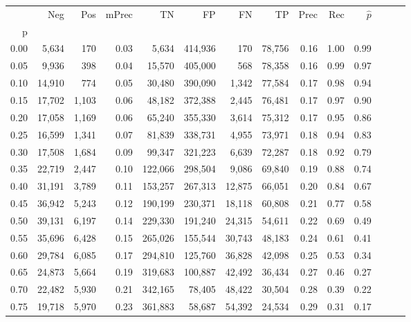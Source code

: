 \begin{tabular}{rrrrrrrrrrrrrr}
\toprule
{} &     Neg &    Pos & mPrec &       TN &       FP &      FN &      TP &  Prec &   Rec & $\hat{p}$ \\
p    &         &        &       &          &          &         &         &       &       &           \\
\midrule
0.00 &   5,634 &    170 &  0.03 &    5,634 &  414,936 &     170 &  78,756 &  0.16 &  1.00 &      0.99 \\
0.05 &   9,936 &    398 &  0.04 &   15,570 &  405,000 &     568 &  78,358 &  0.16 &  0.99 &      0.97 \\
0.10 &  14,910 &    774 &  0.05 &   30,480 &  390,090 &   1,342 &  77,584 &  0.17 &  0.98 &      0.94 \\
0.15 &  17,702 &  1,103 &  0.06 &   48,182 &  372,388 &   2,445 &  76,481 &  0.17 &  0.97 &      0.90 \\
0.20 &  17,058 &  1,169 &  0.06 &   65,240 &  355,330 &   3,614 &  75,312 &  0.17 &  0.95 &      0.86 \\
0.25 &  16,599 &  1,341 &  0.07 &   81,839 &  338,731 &   4,955 &  73,971 &  0.18 &  0.94 &      0.83 \\
0.30 &  17,508 &  1,684 &  0.09 &   99,347 &  321,223 &   6,639 &  72,287 &  0.18 &  0.92 &      0.79 \\
0.35 &  22,719 &  2,447 &  0.10 &  122,066 &  298,504 &   9,086 &  69,840 &  0.19 &  0.88 &      0.74 \\
0.40 &  31,191 &  3,789 &  0.11 &  153,257 &  267,313 &  12,875 &  66,051 &  0.20 &  0.84 &      0.67 \\
0.45 &  36,942 &  5,243 &  0.12 &  190,199 &  230,371 &  18,118 &  60,808 &  0.21 &  0.77 &      0.58 \\
0.50 &  39,131 &  6,197 &  0.14 &  229,330 &  191,240 &  24,315 &  54,611 &  0.22 &  0.69 &      0.49 \\
0.55 &  35,696 &  6,428 &  0.15 &  265,026 &  155,544 &  30,743 &  48,183 &  0.24 &  0.61 &      0.41 \\
0.60 &  29,784 &  6,085 &  0.17 &  294,810 &  125,760 &  36,828 &  42,098 &  0.25 &  0.53 &      0.34 \\
0.65 &  24,873 &  5,664 &  0.19 &  319,683 &  100,887 &  42,492 &  36,434 &  0.27 &  0.46 &      0.27 \\
0.70 &  22,482 &  5,930 &  0.21 &  342,165 &   78,405 &  48,422 &  30,504 &  0.28 &  0.39 &      0.22 \\
0.75 &  19,718 &  5,970 &  0.23 &  361,883 &   58,687 &  54,392 &  24,534 &  0.29 &  0.31 &      0.17 \\

\end{tabular}

